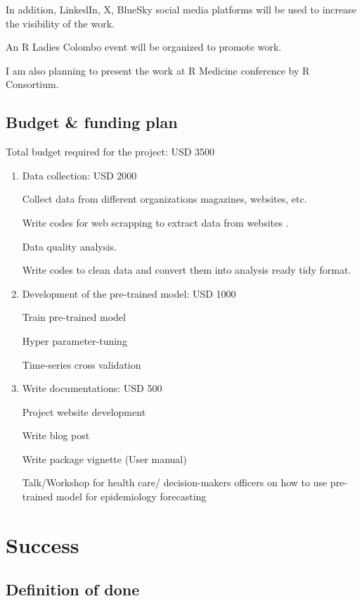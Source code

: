 \documentclass[
]{article}
\begin{document}
In addition, LinkedIn, X, BlueSky social media platforms will be used to
increase the visibility of the work.

An R Ladies Colombo event will be organized to promote work.

I am also planning to present the work at R Medicine conference by R
Consortium.

\subsection{Budget \& funding plan}\label{budget-funding-plan}

Total budget required for the project: USD 3500

\begin{enumerate}
\def\labelenumi{\arabic{enumi}.}
\item
  Data collection: USD 2000

  Collect data from different organizations magazines, websites, etc.

  Write codes for web scrapping to extract data from websites .

  Data quality analysis.

  Write codes to clean data and convert them into analysis ready tidy
  format.
\item
  Development of the pre-trained model: USD 1000

  Train pre-trained model

  Hyper parameter-tuning

  Time-series cross validation
\item
  Write documentations: USD 500

  Project website development

  Write blog post

  Write package vignette (User manual)

  Talk/Workshop for health care/ decision-makers officers on how to use
  pre-trained model for epidemiology forecasting
\end{enumerate}

\section{Success}\label{success}

\subsection{Definition of done}\label{definition-of-done}
\end{document}
